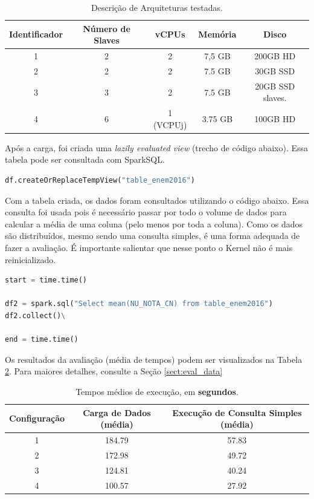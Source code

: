 \documentclass{article}
\begin{document}
\begin{table}[H]
\centering
\begin{tabular}{|c|c|c|c|c|}
\hline
Identificador & Número de Slaves & vCPUs &  Memória & Disco \\ \hline \hline
1 & 2 & 2 & 7,5 GB & 200GB HD  \\ \hline
2 & 2 & 2 & 7.5 GB & 30GB SSD \\ \hline
3 & 3 & 2 & 7.5 GB & 20GB SSD  slaves. \\ \hline
4 & 6 & 1 (VCPUj) & 3.75 GB & 100GB HD   \\ \hline
\end{tabular}
\caption{Descrição de Arquiteturas testadas.}
\label{tab:arqs}
\end{table}

Após a carga, foi criada uma \emph{lazily evaluated view} (trecho de código abaixo). Essa tabela pode ser consultada com SparkSQL. 

\begin{lstlisting}[caption= {Criação da Tabela para Consulta},captionpos=b, language=python]
df.createOrReplaceTempView("table_enem2016")
\end{lstlisting}

Com a tabela criada, os dados foram consultados utilizando o código abaixo. Essa consulta foi usada pois é necessário passar por todo o volume de dados para calcular a média de uma coluna (pelo menos por toda a coluna). Como os dados são distribuídos, mesmo sendo uma consulta simples, é uma forma adequada de fazer a avaliação. É importante salientar que nesse ponto o Kernel não é mais reinicializado.

\begin{lstlisting}[caption= {Consulta Simplificada para Avaliação},captionpos=b, language=python]
start = time.time()

df2 = spark.sql("Select mean(NU_NOTA_CN) from table_enem2016")
df2.collect()\

end = time.time()
\end{lstlisting}

Os resultados da avaliação (média de tempos) podem ser visualizados na Tabela \ref{tab:mean_times}. Para maiores detalhes, consulte a Seção \ref{sect:eval_data}

\begin{table}[H]
\centering
\begin{tabular}{|c|c|c|}
\hline
Configuração & Carga de Dados (média) &  Execução de  Consulta Simples (média) \\ \hline 
\hline
1 & 184.79 &  57.83
\\ \hline
2 & 172.98 & 49.72
 \\ \hline
3 & 124.81
 &  40.24
 \\ \hline
4 & 100.57
 &  27.92
 \\ \hline
\end{tabular}
\caption{Tempos médios de execução, em \textbf{segundos}.}
\label{tab:mean_times}
\end{table}
\end{document}
